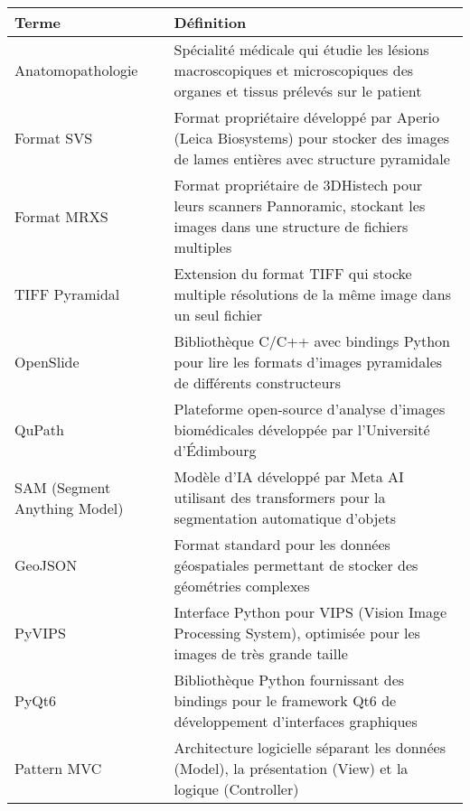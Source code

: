 \documentclass[12pt,a4paper]{report}
\begin{document}
\begin{longtable}{|p{4cm}|p{10cm}|}
\hline
\rowcolor{TableHeaderColor}
\textbf{Terme} & \textbf{Définition} \\
\hline
\endhead

Anatomopathologie & Spécialité médicale qui étudie les lésions macroscopiques et microscopiques des organes et tissus prélevés sur le patient \\
\hline

Format SVS & Format propriétaire développé par Aperio (Leica Biosystems) pour stocker des images de lames entières avec structure pyramidale \\
\hline

Format MRXS & Format propriétaire de 3DHistech pour leurs scanners Pannoramic, stockant les images dans une structure de fichiers multiples \\
\hline

TIFF Pyramidal & Extension du format TIFF qui stocke multiple résolutions de la même image dans un seul fichier \\
\hline

OpenSlide & Bibliothèque C/C++ avec bindings Python pour lire les formats d'images pyramidales de différents constructeurs \\
\hline

QuPath & Plateforme open-source d'analyse d'images biomédicales développée par l'Université d'Édimbourg \\
\hline

SAM (Segment Anything Model) & Modèle d'IA développé par Meta AI utilisant des transformers pour la segmentation automatique d'objets \\
\hline

GeoJSON & Format standard pour les données géospatiales permettant de stocker des géométries complexes \\
\hline

PyVIPS & Interface Python pour VIPS (Vision Image Processing System), optimisée pour les images de très grande taille \\
\hline

PyQt6 & Bibliothèque Python fournissant des bindings pour le framework Qt6 de développement d'interfaces graphiques \\
\hline

Pattern MVC & Architecture logicielle séparant les données (Model), la présentation (View) et la logique (Controller) \\
\hline


\end{longtable}
\end{document}
